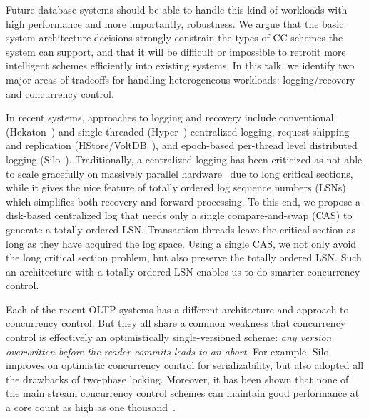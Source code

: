 \documentclass[preprint]{sig-alternate-nocprt}
\begin{document}
Future database systems should be able to handle this kind of workloads with high performance and more importantly, robustness. We argue that the basic system architecture decisions strongly constrain the types of CC schemes the system can support, and that it will be difficult or impossible to retrofit more intelligent schemes efficiently into existing systems. In this talk, we identify two major areas of tradeoffs for handling heterogeneous workloads: logging/recovery and concurrency control.




In recent systems, approaches to logging and recovery include conventional (Hekaton~\cite{Hekaton}) and single-threaded (Hyper~\cite{Hyper}) centralized logging, request shipping and replication (HStore/VoltDB~\cite{HStore}), and epoch-based per-thread level distributed logging (Silo~\cite{Silo}). Traditionally, a centralized logging has been criticized as not able to scale gracefully on massively parallel hardware~\cite{AetherJournal} due to long critical sections, while it gives the nice feature of totally ordered log sequence numbers (LSNs) which simplifies both recovery and forward processing. To this end, we propose a disk-based centralized log that needs only a single compare-and-swap (CAS) to generate a totally ordered LSN. Transaction threads leave the critical section as long as they have acquired the log space. Using a single CAS, we not only avoid the long critical section problem, but also preserve the totally ordered LSN. Such an architecture with a totally ordered LSN enables us to do smarter concurrency control.

Each of the recent OLTP systems has a different architecture and approach to concurrency control. But they all share a common weakness that concurrency control is effectively an optimistically single-versioned scheme: \textit{any version overwritten before the reader commits leads to an abort}. For example, Silo improves on optimistic concurrency control for serializability, but also adopted all the drawbacks of two-phase locking. Moreover, it has been shown that none of the main stream concurrency control schemes can maintain good performance at a core count as high as one thousand~\cite{CCAbyss}.
\end{document}
